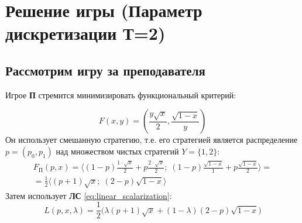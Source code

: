 \section{Решение игры (Параметр дискретизации Т=2)}

\subsection{Рассмотрим игру за преподавателя}

Игрое \textbf{П} стремится минимизировать функциональный критерий: 
	
$$
	F(x, y) = (\frac{y\sqrt{x}}{2},\frac{\sqrt{1-x}}{y})
$$	
Он использует смешанную стратегию, т.е. его стратегией является
распределение $p=(p_0,p_1)$ над множеством чистых стратегий $Y=\{1,2\}$:
\begin{multline*}
	F_\textrm{П}(p,x)=
	\big \langle 
		(1-p)\frac{1 \cdot \sqrt{x}}{2} + p \frac{2 \cdot \sqrt{x}}{2}; \;
		(1-p)\frac{\sqrt{1-x}}{1}+p\frac{\sqrt{1-x}}{2} 
	\big \rangle= \\
	=\frac{1}{2}
	\big \langle
		(p+1)\sqrt{x}; \;
		(2-p)\sqrt{1-x}
	\big \rangle
\end{multline*}
Затем использует \textbf{ЛС} \eqref{eq:linear_scalarization}:
$$
	L(p,x,\lambda)=
	\frac{1}{2}
	\big(
		\lambda(p+1)\sqrt{x} + (1-\lambda)(2-p)\sqrt{1-x}
	\big)
$$
	
